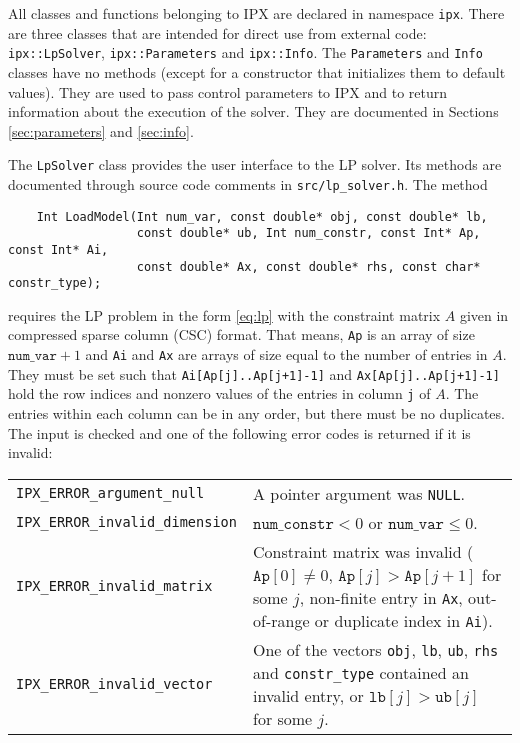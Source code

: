 \documentclass{article}
\newcommand{\ct}{\texttt}
\begin{document}
\newpage
All classes and functions belonging to IPX are declared in namespace \ct{ipx}.
There are three classes that are intended for direct use from external code:
\ct{ipx::LpSolver}, \ct{ipx::Parameters} and \ct{ipx::Info}. The \ct{Parameters}
and \ct{Info} classes have no methods (except for a constructor that initializes
them to default values). They are used to pass control parameters to IPX and to
return information about the execution of the solver. They are documented in
Sections \ref{sec:parameters} and \ref{sec:info}.

The \ct{LpSolver} class provides the user interface to the LP solver. Its
methods are documented through source code comments in \ct{src/lp\_solver.h}.
The method
\begin{footnotesize}
\begin{verbatim}
    Int LoadModel(Int num_var, const double* obj, const double* lb,
                  const double* ub, Int num_constr, const Int* Ap, const Int* Ai,
                  const double* Ax, const double* rhs, const char* constr_type);
\end{verbatim}
\end{footnotesize}
requires the LP problem in the form \eqref{eq:lp} with the constraint matrix $A$
given in compressed sparse column (CSC) format. That means, \ct{Ap} is an array
of size $\ct{num\_var}+1$ and \ct{Ai} and \ct{Ax} are arrays of size equal to
the number of entries in $A$. They must be set such that
\ct{Ai[Ap[j]..Ap[j+1]-1]} and \ct{Ax[Ap[j]..Ap[j+1]-1]} hold the row indices and
nonzero values of the entries in column \ct{j} of $A$. The entries within each
column can be in any order, but there must be no duplicates. The input is
checked and one of the following error codes is returned if it is invalid:
\\[1.5em]
\begin{tabular}{lp{8cm}}
  \ct{IPX\_ERROR\_argument\_null} & A pointer argument was \ct{NULL}.\\
  \ct{IPX\_ERROR\_invalid\_dimension} & $\ct{num\_constr}<0$ or
  $\ct{num\_var}\le0$.\\
  \ct{IPX\_ERROR\_invalid\_matrix} & Constraint matrix was invalid
  ($\ct{Ap}[0]\neq0$, $\ct{Ap}[j]>\ct{Ap}[j+1]$ for some $j$, non-finite entry
  in \ct{Ax}, out-of-range or duplicate index in \ct{Ai}).\\
  \ct{IPX\_ERROR\_invalid\_vector} & One of the vectors \ct{obj}, \ct{lb},
  \ct{ub}, \ct{rhs} and \ct{constr\_type} contained an invalid entry, or
  $\ct{lb}[j]>\ct{ub}[j]$ for some $j$.\\
\end{tabular}\\[1.5em]
\end{document}
